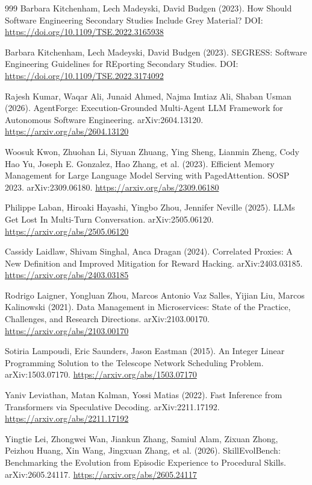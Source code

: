 \begin{thebibliography}{999}
 Barbara Kitchenham, Lech Madeyski, David Budgen (2023). How Should Software Engineering Secondary Studies Include Grey Material? DOI: \url{https://doi.org/10.1109/TSE.2022.3165938}

 Barbara Kitchenham, Lech Madeyski, David Budgen (2023). SEGRESS: Software Engineering Guidelines for REporting Secondary Studies. DOI: \url{https://doi.org/10.1109/TSE.2022.3174092}

 Rajesh Kumar, Waqar Ali, Junaid Ahmed, Najma Imtiaz Ali, Shaban Usman (2026). AgentForge: Execution-Grounded Multi-Agent LLM Framework for Autonomous Software Engineering. arXiv:2604.13120. \url{https://arxiv.org/abs/2604.13120}

 Woosuk Kwon, Zhuohan Li, Siyuan Zhuang, Ying Sheng, Lianmin Zheng, Cody Hao Yu, Joseph E. Gonzalez, Hao Zhang, et al. (2023). Efficient Memory Management for Large Language Model Serving with PagedAttention. SOSP 2023. arXiv:2309.06180. \url{https://arxiv.org/abs/2309.06180}

 Philippe Laban, Hiroaki Hayashi, Yingbo Zhou, Jennifer Neville (2025). LLMs Get Lost In Multi-Turn Conversation. arXiv:2505.06120. \url{https://arxiv.org/abs/2505.06120}

 Cassidy Laidlaw, Shivam Singhal, Anca Dragan (2024). Correlated Proxies: A New Definition and Improved Mitigation for Reward Hacking. arXiv:2403.03185. \url{https://arxiv.org/abs/2403.03185}

 Rodrigo Laigner, Yongluan Zhou, Marcos Antonio Vaz Salles, Yijian Liu, Marcos Kalinowski (2021). Data Management in Microservices: State of the Practice, Challenges, and Research Directions. arXiv:2103.00170. \url{https://arxiv.org/abs/2103.00170}

 Sotiria Lampoudi, Eric Saunders, Jason Eastman (2015). An Integer Linear Programming Solution to the Telescope Network Scheduling Problem. arXiv:1503.07170. \url{https://arxiv.org/abs/1503.07170}

 Yaniv Leviathan, Matan Kalman, Yossi Matias (2022). Fast Inference from Transformers via Speculative Decoding. arXiv:2211.17192. \url{https://arxiv.org/abs/2211.17192}

 Yingtie Lei, Zhongwei Wan, Jiankun Zhang, Samiul Alam, Zixuan Zhong, Peizhou Huang, Xin Wang, Jingxuan Zhang, et al. (2026). SkillEvolBench: Benchmarking the Evolution from Episodic Experience to Procedural Skills. arXiv:2605.24117. \url{https://arxiv.org/abs/2605.24117}


\end{thebibliography}
